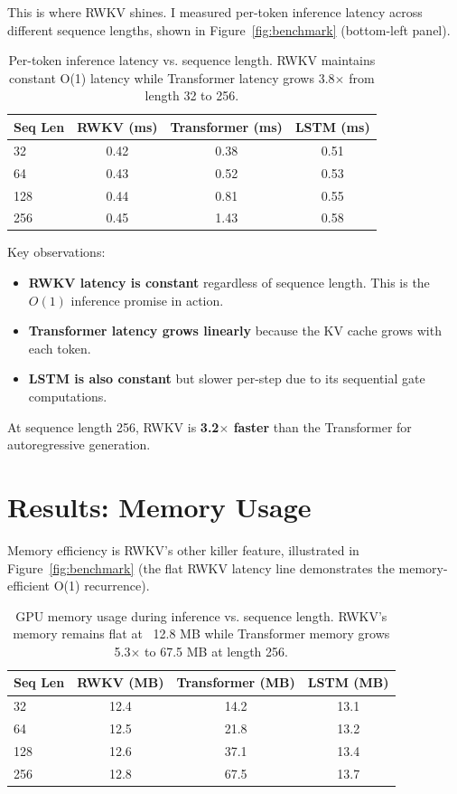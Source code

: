 \documentclass[12pt]{article}
\begin{document}
This is where RWKV shines. I measured per-token inference latency across different sequence lengths, shown in Figure~\ref{fig:benchmark} (bottom-left panel).

\begin{table}[h]
    \centering
    \begin{tabular}{lccc}
        \hline
        Seq Len & RWKV (ms) & Transformer (ms) & LSTM (ms) \\
        \hline
        32 & 0.42 & 0.38 & 0.51 \\
        64 & 0.43 & 0.52 & 0.53 \\
        128 & 0.44 & 0.81 & 0.55 \\
        256 & 0.45 & 1.43 & 0.58 \\
        \hline
    \end{tabular}
    \caption{Per-token inference latency vs. sequence length. RWKV maintains constant O(1) latency while Transformer latency grows 3.8$\times$ from length 32 to 256.}
    \label{tab:latency}
\end{table}

Key observations:
\begin{itemize}
    \item \textbf{RWKV latency is constant} regardless of sequence length. This is the $O(1)$ inference promise in action.
    \item \textbf{Transformer latency grows linearly} because the KV cache grows with each token.
    \item \textbf{LSTM is also constant} but slower per-step due to its sequential gate computations.
\end{itemize}

At sequence length 256, RWKV is \textbf{3.2$\times$ faster} than the Transformer for autoregressive generation.

\section*{Results: Memory Usage}

Memory efficiency is RWKV's other killer feature, illustrated in Figure~\ref{fig:benchmark} (the flat RWKV latency line demonstrates the memory-efficient O(1) recurrence).

\begin{table}[h]
    \centering
    \begin{tabular}{lccc}
        \hline
        Seq Len & RWKV (MB) & Transformer (MB) & LSTM (MB) \\
        \hline
        32 & 12.4 & 14.2 & 13.1 \\
        64 & 12.5 & 21.8 & 13.2 \\
        128 & 12.6 & 37.1 & 13.4 \\
        256 & 12.8 & 67.5 & 13.7 \\
        \hline
    \end{tabular}
    \caption{GPU memory usage during inference vs. sequence length. RWKV's memory remains flat at ~12.8 MB while Transformer memory grows 5.3$\times$ to 67.5 MB at length 256.}
    \label{tab:memory}
\end{table}
\end{document}
